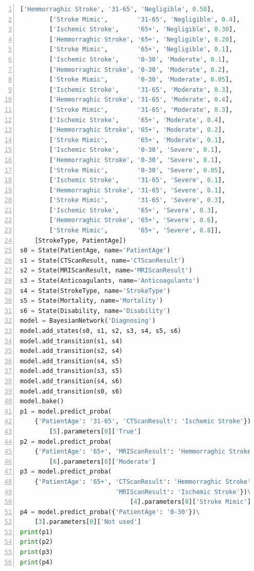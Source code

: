 \documentclass[a4paper, 11pt]{article}
\begin{document}
\begin{lstlisting}[title=diagnosing.py,language=python,numbers=left]
        ['Hemmorraghic Stroke', '31-65', 'Negligible', 0.50],
        ['Stroke Mimic',        '31-65', 'Negligible', 0.4],
        ['Ischemic Stroke',     '65+', 'Negligible', 0.30],
        ['Hemmorraghic Stroke', '65+', 'Negligible', 0.20],
        ['Stroke Mimic',        '65+', 'Negligible', 0.1],
        ['Ischemic Stroke',     '0-30', 'Moderate', 0.1],
        ['Hemmorraghic Stroke', '0-30', 'Moderate', 0.2],
        ['Stroke Mimic',        '0-30', 'Moderate', 0.05],
        ['Ischemic Stroke',     '31-65', 'Moderate', 0.3],
        ['Hemmorraghic Stroke', '31-65', 'Moderate', 0.4],
        ['Stroke Mimic',        '31-65', 'Moderate', 0.3],
        ['Ischemic Stroke',     '65+', 'Moderate', 0.4],
        ['Hemmorraghic Stroke', '65+', 'Moderate', 0.2],
        ['Stroke Mimic',        '65+', 'Moderate', 0.1],
        ['Ischemic Stroke',     '0-30', 'Severe', 0.1],
        ['Hemmorraghic Stroke', '0-30', 'Severe', 0.1],
        ['Stroke Mimic',        '0-30', 'Severe', 0.05],
        ['Ischemic Stroke',     '31-65', 'Severe', 0.1],
        ['Hemmorraghic Stroke', '31-65', 'Severe', 0.1],
        ['Stroke Mimic',        '31-65', 'Severe', 0.3],
        ['Ischemic Stroke',     '65+', 'Severe', 0.3],
        ['Hemmorraghic Stroke', '65+', 'Severe', 0.6],
        ['Stroke Mimic',        '65+', 'Severe', 0.8]],
    [StrokeType, PatientAge])
s0 = State(PatientAge, name='PatientAge')
s1 = State(CTScanResult, name='CTScanResult')
s2 = State(MRIScanResult, name='MRIScanResult')
s3 = State(Anticoagulants, name='Anticoagulants')
s4 = State(StrokeType, name='StrokeType')
s5 = State(Mortality, name='Mortality')
s6 = State(Disability, name='Disability')
model = BayesianNetwork('Diagnosing')
model.add_states(s0, s1, s2, s3, s4, s5, s6)
model.add_transition(s1, s4)
model.add_transition(s2, s4)
model.add_transition(s4, s5)
model.add_transition(s3, s5)
model.add_transition(s4, s6)
model.add_transition(s0, s6)
model.bake()
p1 = model.predict_proba(
    {'PatientAge': '31-65', 'CTScanResult': 'Ischemic Stroke'})\
        [5].parameters[0]['True']
p2 = model.predict_proba(
    {'PatientAge': '65+', 'MRIScanResult': 'Hemmorraghic Stroke'})\
        [6].parameters[0]['Moderate']
p3 = model.predict_proba(
    {'PatientAge': '65+', 'CTScanResult': 'Hemmorraghic Stroke',
                          'MRIScanResult': 'Ischemic Stroke'})\
                              [4].parameters[0]['Stroke Mimic']
p4 = model.predict_proba({'PatientAge': '0-30'})\
    [3].parameters[0]['Not used']
print(p1)
print(p2)
print(p3)
print(p4)
\end{lstlisting}
\end{document}
